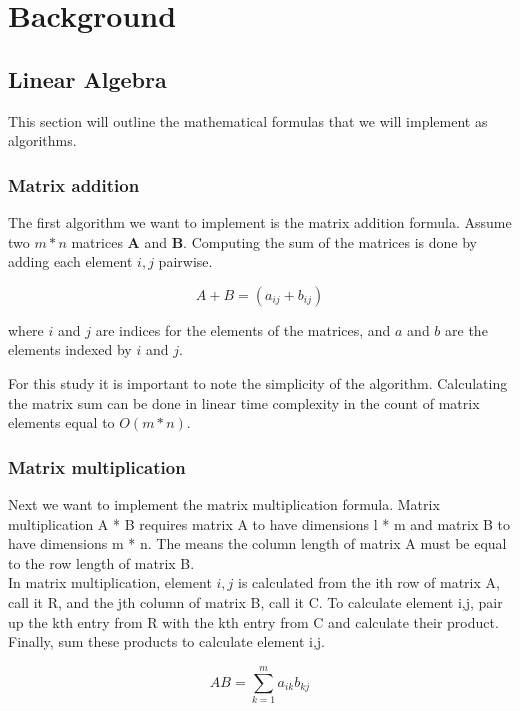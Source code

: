\section{Background}

\subsection{Linear Algebra}

This section will outline the mathematical formulas that we will implement as algorithms. 

\subsubsection{Matrix addition}

The first algorithm we want to implement is the matrix addition formula. Assume two \(m * n\) matrices \(\mathbf{A}\) and \(\mathbf{B}\). Computing the sum of the matrices is done by adding each element \(i,j\) pairwise. 

\[A + B = (a_{ij} + b_{ij})\]

where \(i\) and \(j\) are indices for the elements of the matrices, and \(a\) and \(b\) are the elements indexed by \(i\) and \(j\). 

For this study it is important to note the simplicity of the algorithm. Calculating the matrix sum can be done in linear time complexity in the count of matrix elements equal to $O(m * n)$. 


\subsubsection{Matrix multiplication}

Next we want to implement the matrix multiplication formula. Matrix multiplication A * B requires matrix A to have dimensions l * m and matrix B to have dimensions m * n. The means the column length of matrix A must be equal to the row length of matrix B. \\
In matrix multiplication, element \(i,j\) is calculated from the ith row of matrix A, call it R, and the jth column of matrix B, call it C. To calculate element i,j, pair up the kth entry from R with the kth entry from C and calculate their product. Finally, sum these products to calculate element i,j. 

\[AB = \sum_{k=1}^m a_{ik} b_{kj}\]




